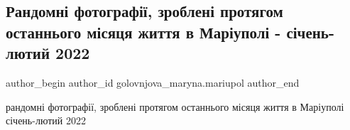  
 
 
 
 

\subsection{Рандомні фотографії, зроблені протягом останнього місяця життя в Маріуполі - січень-лютий 2022}
\label{sec:23_02_2023.fb.golovnjova_maryna.mariupol.1.randomn__fotograf__}

\ifcmt
 author_begin
   author_id golovnjova_maryna.mariupol
 author_end
\fi

рандомні фотографії, зроблені протягом останнього місяця життя в Маріуполі січень-лютий 2022

